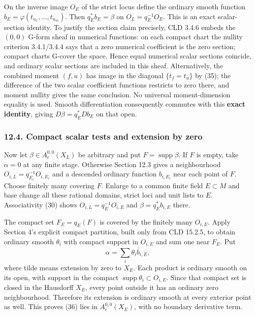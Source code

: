 \documentclass[
  11pt,
]{article}
\begin{document}
On the inverse image \(O_E\) of the strict locus define the ordinary
smooth function \(b_E=\varphi(t_{u_1},\ldots,t_{u_m})\). Then
\(q_E^*b_E=\beta\) on \(O_L=q_E^{-1}O_E\). This is an exact
scalar-section identity. To justify the section claim precisely, CLD
3.4.6 embeds the \((0,0)\) G-form sheaf in numerical functions: on each
compact chart the nullity criterion 3.4.1/3.4.4 says that a zero
numerical coefficient is the zero section; compact charts G-cover the
space. Hence equal numerical scalar sections coincide, and ordinary
scalar sections are included in this sheaf. Alternatively, the combined
moment \((f,u)\) has image in the diagonal \(\{t_f=t_u\}\) by (35); the
difference of the two scalar coefficient functions restricts to zero
there, and moment nullity gives the same conclusion. No universal
moment-dimension equality is used. Smooth differentiation consequently
commutes with this \textbf{exact identity}, giving \(D\beta=q_E^*Db_E\)
on that open.

\subsubsection{12.4. Compact scalar tests and extension by
zero}\label{compact-scalar-tests-and-extension-by-zero}

Now let \(\beta\in A_c^{0,0}(X_L)\) be arbitrary and put
\(F=\operatorname{supp}\beta\). If \(F\) is empty, take \(\alpha=0\) at
any finite stage. Otherwise Section 12.3 gives a neighbourhood
\(O_{i,L}=q_{E_i}^{-1}O_{i,E_i}\) and a descended ordinary function
\(b_{i,E_i}\) near each point of \(F\). Choose finitely many covering
\(F\). Enlarge to a common finite field \(E\subset M\) and base change
all these rational domains, strict loci and unit lists to \(E\).
Associativity (30) shows \(O_{i,L}=q_E^{-1}O_{i,E}\) and
\(\beta=q_E^*b_{i,E}\) there.

The compact set \(F_E=q_E(F)\) is covered by the finitely many
\(O_{i,E}\). Apply Section 4's explicit compact partition, built only
from CLD 15.2.5, to obtain ordinary smooth \(\theta_i\) with compact
support in \(O_{i,E}\) and sum one near \(F_E\). Put \[
                \alpha=\sum_i\widetilde{\theta_i b_{i,E}},
                                                               \tag{36}
\] where tilde means extension by zero to \(X_E\). Each product is
ordinary smooth on its open, with support in the compact
\(\operatorname{supp}\theta_i\subset O_{i,E}\). Since that compact set
is closed in the Hausdorff \(X_E\), every point outside it has an
ordinary zero neighbourhood. Therefore its extension is ordinary smooth
at every exterior point as well. This proves (36) lies in
\(A_c^{0,0}(X_E)\), with no boundary derivative term.
\end{document}
